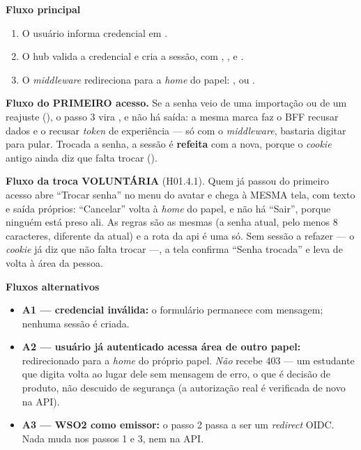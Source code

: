 \textbf{Fluxo principal}
\begin{enumerate}
  \item O usuário informa credencial em .
  \item O hub valida a credencial e cria a sessão, com ,
    ,  e .
  \item O \emph{middleware} redireciona para a \emph{home} do papel:
    ,  ou .
\end{enumerate}

\textbf{Fluxo do PRIMEIRO acesso.} Se a senha veio de uma importação ou de um
reajuste (), o passo 3 vira , e não há
saída: a mesma marca faz o BFF recusar dados e o  recusar
\emph{token} de experiência --- só com o \emph{middleware}, bastaria digitar
 para pular. Trocada a senha, a sessão é \textbf{refeita} com a
nova, porque o \emph{cookie} antigo ainda diz que falta trocar ().

\textbf{Fluxo da troca VOLUNTÁRIA} (H01.4.1). Quem já passou do primeiro acesso
abre \enquote{Trocar senha} no menu do avatar e chega à MESMA tela, com texto e
saída próprios: \enquote{Cancelar} volta à \emph{home} do papel, e não há
\enquote{Sair}, porque ninguém está preso ali. As regras são as mesmas (a senha
atual, pelo menos 8 caracteres, diferente da atual) e a rota da api é uma só.
Sem sessão a refazer --- o \emph{cookie} já diz que não falta trocar ---, a tela
confirma \enquote{Senha trocada} e leva de volta à área da pessoa.

\textbf{Fluxos alternativos}
\begin{itemize}
  \item \textbf{A1 --- credencial inválida:} o formulário permanece com
    mensagem; nenhuma sessão é criada.
  \item \textbf{A2 --- usuário já autenticado acessa área de outro papel:}
    redirecionado para a \emph{home} do próprio papel. \emph{Não} recebe 403 ---
    um estudante que digita  volta ao lugar dele sem mensagem de
    erro, o que é decisão de produto, não descuido de segurança (a autorização
    real é verificada de novo na API).
  \item \textbf{A3 --- WSO2 como emissor:} o passo 2 passa a ser um
    \emph{redirect} OIDC. Nada muda nos passos 1 e 3, nem na API.
\end{itemize}

